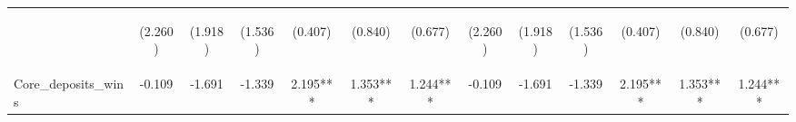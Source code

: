\documentclass[]{article}
\begin{document}
\begin{center}
\begin{tabular}{lcccccccccccc}
\vspace{4pt} & \begin{footnotesize}(2.260)\end{footnotesize} & \begin{footnotesize}(1.918)\end{footnotesize} & \begin{footnotesize}(1.536)\end{footnotesize} & \begin{footnotesize}(0.407)\end{footnotesize} & \begin{footnotesize}(0.840)\end{footnotesize} & \begin{footnotesize}(0.677)\end{footnotesize} & \begin{footnotesize}(2.260)\end{footnotesize} & \begin{footnotesize}(1.918)\end{footnotesize} & \begin{footnotesize}(1.536)\end{footnotesize} & \begin{footnotesize}(0.407)\end{footnotesize} & \begin{footnotesize}(0.840)\end{footnotesize} & \begin{footnotesize}(0.677)\end{footnotesize} \\
Core\_deposits\_wins & -0.109 & -1.691 & -1.339 & 2.195*** & 1.353*** & 1.244*** & -0.109 & -1.691 & -1.339 & 2.195*** & 1.353*** & 1.244*** \\

\end{tabular}
\end{center}
\end{document}

